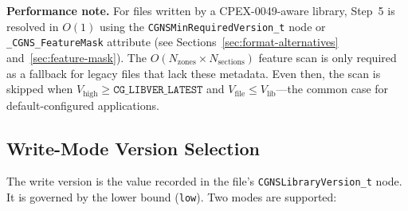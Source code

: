 \documentclass[11pt,letterpaper]{article}
\begin{document}
\textbf{Performance note.}  For files written by a CPEX-0049-aware
library, Step~5 is resolved in $O(1)$ using the
\texttt{CGNSMinRequiredVersion\_t} node or \texttt{\_CGNS\_FeatureMask}
attribute (see Sections~\ref{sec:format-alternatives}
and~\ref{sec:feature-mask}).  The $O(N_{\mathrm{zones}} \times
N_{\mathrm{sections}})$ feature scan is only required as a fallback
for legacy files that lack these metadata.  Even then, the scan is
skipped when $V_{\mathrm{high}} \geq \texttt{CG\_LIBVER\_LATEST}$
and $V_{\mathrm{file}} \leq V_{\mathrm{lib}}$---the common case for
default-configured applications.

\subsection{Write-Mode Version Selection}
\label{sec:write-mode}

The write version is the value recorded in the file's
\texttt{CGNSLibraryVersion\_t} node.  It is governed by the lower
bound (\texttt{low}).  Two modes are supported:
\end{document}
